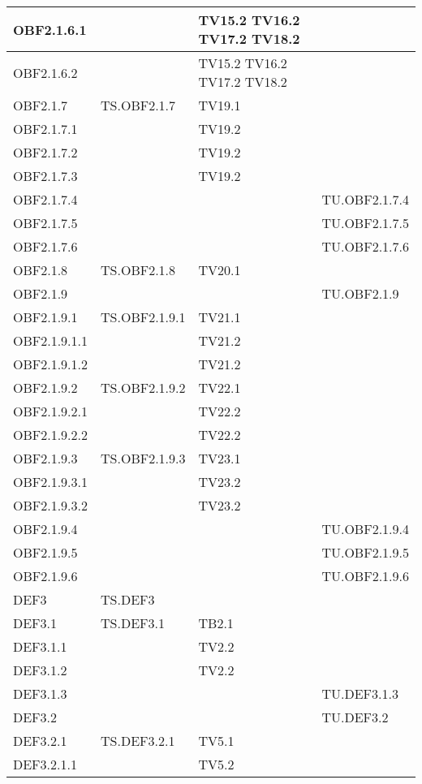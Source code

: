 \documentclass{scalatekids-article}
\begin{document}
\begin{longtable}[H]{|l|p{4cm}|p{4cm}|p{4cm}|}
  \hline
  OBF2.1.6.1 & & TV15.2 TV16.2 TV17.2 TV18.2 &\\
  \hline
  OBF2.1.6.2 & & TV15.2 TV16.2 TV17.2 TV18.2 &\\
  \hline
  OBF2.1.7 & TS.OBF2.1.7 & TV19.1 &\\
  \hline
  OBF2.1.7.1 & & TV19.2 &\\
  \hline
  OBF2.1.7.2 & & TV19.2 &\\
  \hline
  OBF2.1.7.3 & & TV19.2 &\\
  \hline
  OBF2.1.7.4 & & & TU.OBF2.1.7.4 \\ %
  \hline
  OBF2.1.7.5 & &  & TU.OBF2.1.7.5 \\ %
  \hline
  OBF2.1.7.6 & &  & TU.OBF2.1.7.6 \\ %
  \hline
  OBF2.1.8 & TS.OBF2.1.8 & TV20.1 &\\
  \hline
  OBF2.1.9 & &  & TU.OBF2.1.9 \\
  \hline
  OBF2.1.9.1 & TS.OBF2.1.9.1 & TV21.1 &\\
  \hline
  OBF2.1.9.1.1 & & TV21.2 &\\
  \hline
  OBF2.1.9.1.2 & & TV21.2 &\\
  \hline
  OBF2.1.9.2 & TS.OBF2.1.9.2 & TV22.1 &\\
  \hline
  OBF2.1.9.2.1 & & TV22.2 &\\
  \hline
  OBF2.1.9.2.2 & & TV22.2 &\\
  \hline
  OBF2.1.9.3 & TS.OBF2.1.9.3 & TV23.1 &\\
  \hline
  OBF2.1.9.3.1 & & TV23.2 &\\
  \hline
  OBF2.1.9.3.2 & & TV23.2 &\\
  \hline
  OBF2.1.9.4 & & & TU.OBF2.1.9.4 \\ %
  \hline
  OBF2.1.9.5 & & & TU.OBF2.1.9.5 \\ %
  \hline
  OBF2.1.9.6 & & & TU.OBF2.1.9.6 \\ %
  \hline
  DEF3 & TS.DEF3 &  &\\
  \hline
  DEF3.1 & TS.DEF3.1 & TB2.1 &\\
  \hline
  DEF3.1.1 & & TV2.2 &\\
  \hline
  DEF3.1.2 & & TV2.2 &\\
  \hline
  DEF3.1.3 & & & TU.DEF3.1.3\\
  \hline
  DEF3.2 & & & TU.DEF3.2\\
  \hline
  DEF3.2.1 & TS.DEF3.2.1 & TV5.1  &\\
  \hline
  DEF3.2.1.1 & & TV5.2 &\\

\end{longtable}
\end{document}
